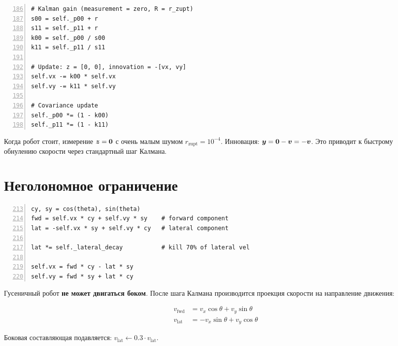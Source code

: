 \begin{filebox}[title={\filepath{velocity\_ekf.py}, строки 181--207 --- update\_zupt()}]
\begin{lstlisting}[style=pythonstyle, numbers=left, firstnumber=186]
# Kalman gain (measurement = zero, R = r_zupt)
s00 = self._p00 + r
s11 = self._p11 + r
k00 = self._p00 / s00
k11 = self._p11 / s11

# Update: z = [0, 0], innovation = -[vx, vy]
self.vx -= k00 * self.vx
self.vy -= k11 * self.vy

# Covariance update
self._p00 *= (1 - k00)
self._p11 *= (1 - k11)
\end{lstlisting}
\end{filebox}

Когда робот стоит, измерение $\bm{z} = \bm{0}$ с очень малым шумом
$r_{\text{zupt}} = 10^{-4}$. Инновация: $\bm{y} = \bm{0} - \bm{v} = -\bm{v}$.
Это приводит к быстрому обнулению скорости через стандартный шаг Калмана.

\section{Неголономное ограничение}
\label{sec:nonholomic}

\begin{filebox}[title={\filepath{velocity\_ekf.py}, строки 209--228 --- apply\_nonholonomic()}]
\begin{lstlisting}[style=pythonstyle, numbers=left, firstnumber=213]
cy, sy = cos(theta), sin(theta)
fwd = self.vx * cy + self.vy * sy    # forward component
lat = -self.vx * sy + self.vy * cy   # lateral component

lat *= self._lateral_decay           # kill 70% of lateral vel

self.vx = fwd * cy - lat * sy
self.vy = fwd * sy + lat * cy
\end{lstlisting}
\end{filebox}

Гусеничный робот \textbf{не может двигаться боком}. После шага Калмана
производится проекция скорости на направление движения:

\begin{align}
  v_{\text{fwd}} &= v_x \cos\theta + v_y \sin\theta \label{eq:fwd} \\
  v_{\text{lat}} &= -v_x \sin\theta + v_y \cos\theta \label{eq:lat}
\end{align}

Боковая составляющая подавляется: $v_{\text{lat}} \leftarrow 0.3 \cdot v_{\text{lat}}$.

